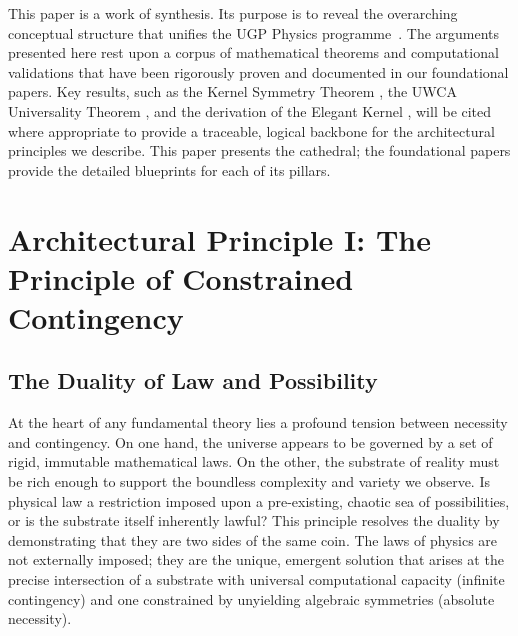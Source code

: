 \documentclass[12pt]{article}
\begin{document}
This paper is a work of synthesis. Its purpose is to reveal the overarching conceptual structure that unifies the UGP Physics programme~\cite{SpivackResearchProgrammes}. The arguments presented here rest upon a corpus of mathematical theorems and computational validations that have been rigorously proven and documented in our foundational papers. Key results, such as the Kernel Symmetry Theorem \cite{Spivack2025UGP}, the UWCA Universality Theorem \cite{Spivack2025UGP}, and the derivation of the Elegant Kernel \cite{Spivack2025_UGPMathFoundations}, will be cited where appropriate to provide a traceable, logical backbone for the architectural principles we describe. This paper presents the cathedral; the foundational papers provide the detailed blueprints for each of its pillars.

\medskip
\noindent{}

\section{Architectural Principle I: The Principle of Constrained Contingency}
\label{sec:constrained_contingency}

\subsection{The Duality of Law and Possibility}
At the heart of any fundamental theory lies a profound tension between necessity and contingency. On one hand, the universe appears to be governed by a set of rigid, immutable mathematical laws. On the other, the substrate of reality must be rich enough to support the boundless complexity and variety we observe. Is physical law a restriction imposed upon a pre-existing, chaotic sea of possibilities, or is the substrate itself inherently lawful? This principle resolves the duality by demonstrating that they are two sides of the same coin. The laws of physics are not externally imposed; they are the unique, emergent solution that arises at the precise intersection of a substrate with universal computational capacity (infinite contingency) and one constrained by unyielding algebraic symmetries (absolute necessity).
\end{document}
